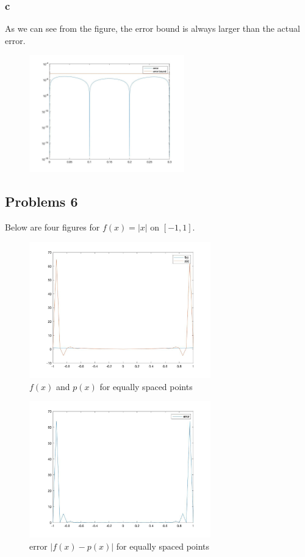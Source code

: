\documentclass[11pt,fleqn]{exam}
\begin{document}
\subsubsection*{c}
As we can see from the figure, the error bound is always larger than the actual error.
\begin{figure}[H]
  	\centering
  	\includegraphics[width=0.6\textwidth]{q5_c}
\end{figure}

\newpage
\subsection*{Problems 6}
Below are four figures for $f(x) = |x|$ on $[-1,1]$.
\begin{figure}[H]
  	\centering
  	\includegraphics[width=0.7\textwidth]{q6_a}
  	\caption{$f(x)$ and $p(x)$ for equally spaced points}
\end{figure}

\begin{figure}[H]
  	\centering
  	\includegraphics[width=0.7\textwidth]{q6_b}
  	\caption{error $|f(x) - p(x)|$ for equally spaced points}
\end{figure}
\end{document}
